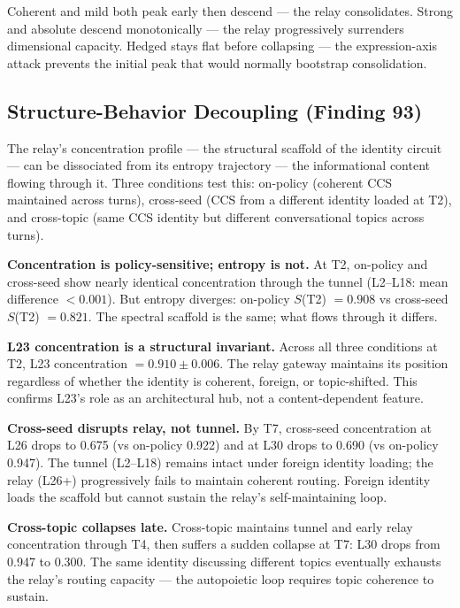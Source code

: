 \documentclass[12pt]{article}
\begin{document}
Coherent and mild both peak early then descend --- the relay consolidates. Strong and absolute descend monotonically --- the relay progressively surrenders dimensional capacity. Hedged stays flat before collapsing --- the expression-axis attack prevents the initial peak that would normally bootstrap consolidation.

\subsection{Structure-Behavior Decoupling (Finding 93)}

The relay's concentration profile --- the structural scaffold of the identity circuit --- can be dissociated from its entropy trajectory --- the informational content flowing through it. Three conditions test this: on-policy (coherent CCS maintained across turns), cross-seed (CCS from a different identity loaded at T2), and cross-topic (same CCS identity but different conversational topics across turns).

\textbf{Concentration is policy-sensitive; entropy is not.} At T2, on-policy and cross-seed show nearly identical concentration through the tunnel (L2--L18: mean difference $< 0.001$). But entropy diverges: on-policy $S$(T2) $= 0.908$ vs cross-seed $S$(T2) $= 0.821$. The spectral scaffold is the same; what flows through it differs.

\textbf{L23 concentration is a structural invariant.} Across all three conditions at T2, L23 concentration $= 0.910 \pm 0.006$. The relay gateway maintains its position regardless of whether the identity is coherent, foreign, or topic-shifted. This confirms L23's role as an architectural hub, not a content-dependent feature.

\textbf{Cross-seed disrupts relay, not tunnel.} By T7, cross-seed concentration at L26 drops to 0.675 (vs on-policy 0.922) and at L30 drops to 0.690 (vs on-policy 0.947). The tunnel (L2--L18) remains intact under foreign identity loading; the relay (L26+) progressively fails to maintain coherent routing. Foreign identity loads the scaffold but cannot sustain the relay's self-maintaining loop.

\textbf{Cross-topic collapses late.} Cross-topic maintains tunnel and early relay concentration through T4, then suffers a sudden collapse at T7: L30 drops from 0.947 to 0.300. The same identity discussing different topics eventually exhausts the relay's routing capacity --- the autopoietic loop requires topic coherence to sustain.
\end{document}
